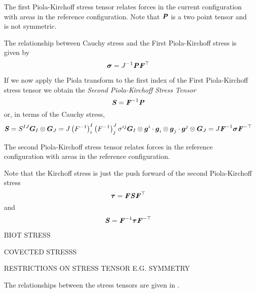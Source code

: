 The first Piola-Kirchoff stress tensor relates forces in the current
configuration with areas in the reference configuration. Note that
$\boldsymbol{\mathit{P}}$ is a two point tensor and is not symmetric.

The relationship between Cauchy stress and the First Piola-Kirchoff stress is
given by
\begin{equation}
  \boldsymbol{\mathit{\sigma}}={J}^{-1}\boldsymbol{\mathit{P}} {\boldsymbol{\mathit{F}}}^{ \top } 
\end{equation}

If we now apply the Piola transform to the first index of the First Piola-Kirchoff stress tensor we obtain
the \emph{Second Piola-Kirchoff Stress Tensor} \ie
\begin{equation}
  \boldsymbol{\mathit{S}}={\boldsymbol{\mathit{F}}}^{-1}\boldsymbol{\mathit{P}}
\end{equation}
or, in terms of the Cauchy stress,
\begin{equation}
  \boldsymbol{\mathit{S}}=S^{IJ}  \boldsymbol{G} _{I} \otimes  \boldsymbol{G} _{J} =J\left( {F}^{-1} \right)^{I}_{i}\left( {F}^{-1} \right)^{J}_{j}\sigma^{ij}    \boldsymbol{G} _{I} \otimes  \boldsymbol{g} ^{i}   \cdot    \boldsymbol{g} _{i} \otimes  \boldsymbol{g} _{j}    \cdot    \boldsymbol{g} ^{j} \otimes  \boldsymbol{G} _{J}  =J{\boldsymbol{\mathit{F}}}^{-1}\boldsymbol{\mathit{\sigma}} {\boldsymbol{\mathit{F}}}^{- \top } 
\end{equation}

The second Piola-Kirchoff stress tensor relates forces in the reference
configuration with areas in the reference configuration.

Note that the Kirchoff stress is just the push forward of the second
Piola-Kirchoff stress \ie
\begin{equation}
  \boldsymbol{\mathit{\tau}}=\boldsymbol{\mathit{F}}\boldsymbol{\mathit{S}} {\boldsymbol{\mathit{F}}}^{ \top } 
\end{equation}
and
\begin{equation}
  \boldsymbol{\mathit{S}}={\boldsymbol{\mathit{F}}}^{-1}\boldsymbol{\mathit{\tau}} {\boldsymbol{\mathit{F}}}^{- \top } 
\end{equation}

BIOT STRESS

COVECTED STRESSS

RESTRICTIONS ON STRESS TENSOR E.G. SYMMETRY

The relationships between the stress tensors are given in .

